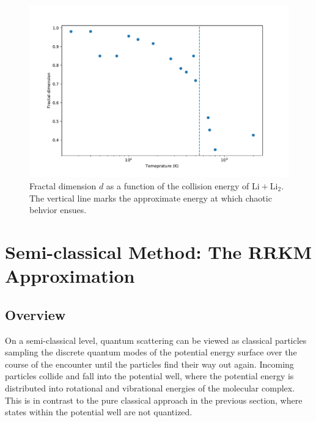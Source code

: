 \documentclass[%
 reprint,
 amsmath,amssymb,
 aps,
 nofootinbib
]{revtex4-1}
\begin{document}
\begin{figure}[ht]
\begin{center}
\includegraphics[width=1.125\linewidth]{fractal_dim.pdf}
\caption{Fractal dimension $d$ as a function of the collision energy of $\mathrm{Li} + \mathrm{Li_2}$. The vertical line marks the approximate energy at which chaotic behvior ensues.}
\label{fig:frac_dim}
\end{center}
\end{figure}

 

\section{\label{sec:RRKM}Semi-classical Method: The RRKM Approximation}

\subsection{\label{sec:RRKM-overview} Overview}

On a semi-classical level, quantum scattering can be viewed as classical particles sampling the discrete quantum modes of the potential energy surface over the course of the encounter until the particles find their way out again. Incoming particles collide and fall into the potential well, where the potential energy is distributed into rotational and vibrational energies of the molecular complex. This is in contrast to the pure classical approach in the previous section, where states within the potential well are not quantized. 
\end{document}
